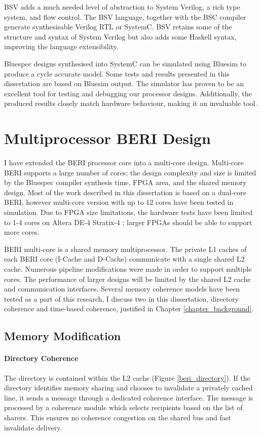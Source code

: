 	BSV adds a much needed level of abstraction to System Verilog, a rich type system, and flow control. The BSV language, together with the BSC compiler generate synthesisable Verilog RTL or SystemC. BSV retains some of the structure and syntax of System Verilog but also adds some Haskell syntax, improving the language extensibility.
	
	Bluespec designs synthesised into SystemC can be simulated using Bluesim to produce a cycle accurate model. Some tests and results presented in this dissertation are based on Bluesim output. The simulator has proven to be an excellent tool for testing and debugging our processor designs. Additionally, the produced results closely match hardware behaviour, making it an invaluable tool.

\section{Multiprocessor BERI Design}
	I have extended the BERI processor core into a multi-core design. Multi-core BERI supports a large number of cores; the design complexity and size is limited by the Bluespec compiler synthesis time, FPGA area, and the shared memory design. Most of the work described in this dissertation is based on a dual-core BERI, however multi-core version with up to 12 cores have been tested in simulation. Due to FPGA size limitations, the hardware tests have been limited to 1-4 cores on Altera DE-4 Stratix-4 \cite{TerasicDE4}; larger FPGAs should be able to support more cores.

	BERI multi-core is a shared memory multiprocessor. The private L1 caches of each BERI core (I-Cache and D-Cache) communicate with a single shared L2 cache. Numerous pipeline modifications were made in order to support multiple cores. The performance of larger designs will be limited by the shared L2 cache and communication interfaces. Several memory coherence models have been tested as a part of this research, I discuss two in this dissertation, directory coherence and time-based coherence, justified in Chapter \ref{chapter_background}. 
	
	\subsection{Memory Modification}
		\paragraph{Directory Coherence} The directory is contained within the L2 cache (Figure \ref{beri_directory}). If the directory identifies memory sharing and chooses to invalidate a privately cached line, it sends a message through a dedicated coherence interface. The message is processed by a coherence module which selects recipients based on the list of sharers. This ensures no coherence congestion on the shared bus and fast invalidate delivery. 
		
